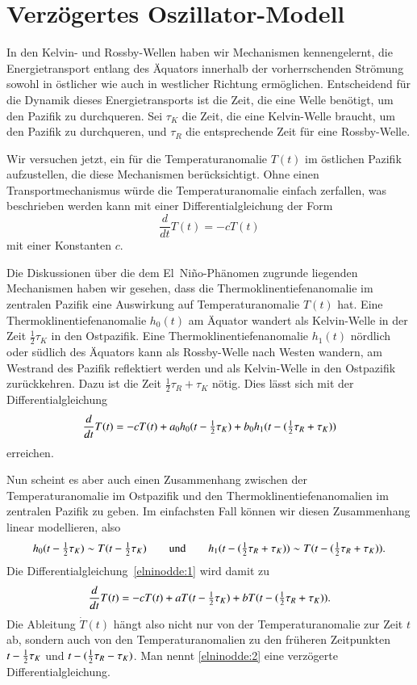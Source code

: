 %
%
%
\section{Verzögertes Oszillator-Modell\label{section:dde-nino}}
In den Kelvin- und Rossby-Wellen haben wir Mechanismen kennengelernt,
die Energietransport entlang des Äquators innerhalb der vorherrschenden
Strömung sowohl in östlicher wie auch in westlicher Richtung ermöglichen.
Entscheidend für die Dynamik dieses Energietransports ist die Zeit,
die eine Welle benötigt, um den Pazifik zu durchqueren.
Sei $\tau_K$ die Zeit, die eine Kelvin-Welle braucht, um den Pazifik
zu durchqueren, und $\tau_R$ die entsprechende Zeit für eine Rossby-Welle.

Wir versuchen jetzt, ein für die Temperaturanomalie $T(t)$ im östlichen
Pazifik aufzustellen, die diese Mechanismen berücksichtigt.
Ohne einen Transportmechanismus würde die Temperaturanomalie einfach
zerfallen, was beschrieben werden kann mit einer Differentialgleichung
der Form
\[
\frac{d}{dt}T(t)
=
-cT(t)
\]
mit einer Konstanten $c$.

\def\halb{\bgroup\textstyle\frac12\egroup}

Die Diskussionen über die dem El~Niño-Phänomen zugrunde liegenden
Mechanismen haben wir gesehen, dass die Thermoklinentiefenanomalie im
zentralen Pazifik eine Auswirkung auf Temperatur\-anomalie $T(t)$ hat.
Eine Thermoklinentiefenanomalie $h_0(t)$ am Äquator wandert als
Kelvin-Welle in der Zeit $\frac12\tau_K$ in den Ostpazifik.
Eine Thermoklinentiefenanomalie $h_1(t)$ nördlich oder südlich des Äquators
kann als Rossby-Welle nach Westen wandern, am Westrand des Pazifik
reflektiert werden und als Kelvin-Welle in den Ostpazifik zurückkehren.
Dazu ist die Zeit $\frac12\tau_R+\tau_K$ nötig.
Dies lässt sich mit der Differentialgleichung
\begin{equation}
\frac{d}{dt}T(t)
=
-cT(t) + a_0h_0(t-\halb\tau_K) + b_0h_1(t-(\halb\tau_R+\tau_K))
\label{elninodde:1}
\end{equation}
erreichen.

Nun scheint es aber auch einen Zusammenhang zwischen der Temperaturanomalie
im Ostpazifik und den Thermoklinentiefenanomalien im zentralen Pazifik zu geben.
Im einfachsten Fall können wir diesen Zusammenhang linear modellieren,
also 
\[
h_0(t-\halb\tau_K)
\sim
T(t-\halb\tau_K)
\qquad
\text{und}
\qquad
h_1(t-(\halb\tau_R+\tau_K))
\sim
T(t-(\halb\tau_R+\tau_K)).
\]
Die Differentialgleichung~\eqref{elninodde:1} wird damit zu
\begin{equation}
\frac{d}{dt}T(t)
=
-cT(t) + aT(t-\halb\tau_K) + bT(t-(\halb\tau_R+\tau_K)).
\label{elninodde:2}
\end{equation}
Die Ableitung $\dot T(t)$ hängt also nicht nur von der Temperaturanomalie
zur Zeit $t$ ab, sondern auch von den Temperaturanomalien zu den
früheren Zeitpunkten $t-\halb\tau_K$ und $t-(\halb\tau_R-\tau_K)$.
Man nennt
\eqref{elninodde:2}
eine verzögerte Differentialgleichung.
%

